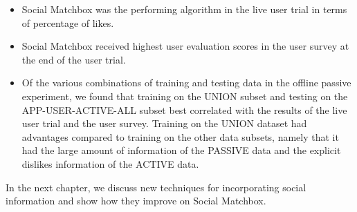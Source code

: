 \begin{itemize}
\item{Social Matchbox was the performing algorithm in the live user trial in terms of percentage of likes.}

\item{Social Matchbox received highest user evaluation scores in the user survey at the end of the user trial.}

\item{Of the various combinations of training and testing data in the offline passive experiment, we found that training on the UNION subset and testing on the APP-USER-ACTIVE-ALL subset best correlated with the results of the live user trial and the user survey. Training on the UNION dataset had advantages compared to training on the other data subsets, namely that it had the large amount of information of the PASSIVE data and the explicit dislikes information of the ACTIVE data.}

\end{itemize}

In the next chapter, we discuss new techniques for incorporating social information and show how they improve on Social Matchbox.
